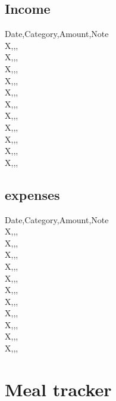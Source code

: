 \documentclass[a4paper]{article}
\begin{document}
\subsection{Income}
Date,Category,Amount,Note\\
X,,,\\
X,,,\\
X,,,\\
X,,,\\
X,,,\\
X,,,\\
X,,,\\
X,,,\\
X,,,\\
X,,,\\
X,,,\\
\subsection{expenses}
Date,Category,Amount,Note\\
X,,,\\
X,,,\\
X,,,\\
X,,,\\
X,,,\\
X,,,\\
X,,,\\
X,,,\\
X,,,\\
X,,,\\
X,,,\\
\newpage
\section{Meal tracker}
\end{document}
